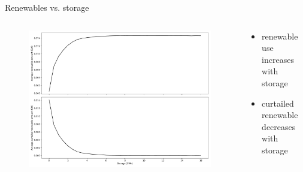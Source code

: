 \documentclass[aspectratio=169,11pt]{beamer}
\begin{document}
\begin{frame}{Renewables vs. storage}
\begin{columns}
    \begin{column}{0.6\textwidth}
        \begin{figure}
            \centering
            \includegraphics[width=\columnwidth]{./figures/p3.pdf}
        \end{figure}
    \end{column}
    \begin{column}{0.4\textwidth}
        \begin{itemize}
            \item renewable use increases with storage
            \item curtailed renewable decreases with storage
        \end{itemize}
    \end{column}
\end{columns}
\end{frame}
\end{document}
